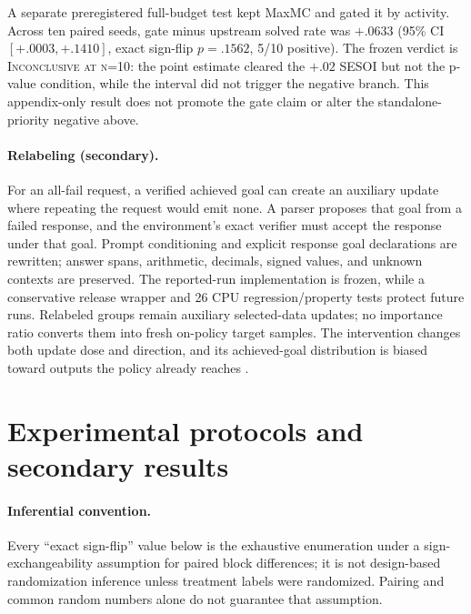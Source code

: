 A separate preregistered full-budget test kept MaxMC and gated it by activity.
Across ten paired seeds, gate minus upstream solved rate was $+.0633$ (95\% CI
$[+.0003,+.1410]$, exact sign-flip $p=.1562$, 5/10 positive). The frozen
verdict is \textsc{Inconclusive at n=10}: the point estimate cleared the
$+.02$ SESOI but not the p-value condition, while the interval did not trigger
the negative branch. This appendix-only result does not promote the gate claim
or alter the standalone-priority negative above.

\paragraph{Relabeling (secondary).}
For an all-fail request, a verified achieved goal can create an auxiliary
update where repeating the request would emit none. A parser proposes that
goal from a failed response, and the environment's
exact verifier must accept the response under that goal. Prompt conditioning
and explicit response goal declarations are rewritten; answer spans,
arithmetic, decimals, signed values, and unknown contexts are preserved. The
reported-run implementation is frozen, while a conservative release wrapper
and 26 CPU regression/property tests protect future runs. Relabeled groups
remain auxiliary selected-data updates; no importance ratio converts them
into fresh on-policy target samples. The intervention changes both update dose
and direction, and its achieved-goal distribution is biased toward outputs the
policy already reaches \citep{her,gcsl}.

\section{Experimental protocols and secondary results}
\label{app:protocols}

\paragraph{Inferential convention.}
Every ``exact sign-flip'' value below is the exhaustive enumeration under a
sign-exchangeability assumption for paired block differences; it is not
design-based randomization inference unless treatment labels were randomized.
Pairing and common random numbers alone do not guarantee that assumption.

